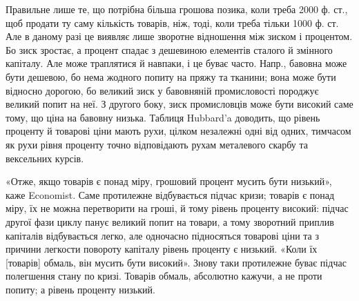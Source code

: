 Правильне лише те, що потрібна більша грошова позика, коли треба
2000 ф. ст., щоб продати ту саму кількість товарів, ніж, тоді, коли треба
тільки 1000 ф. ст. Але в даному разі це виявляє лише зворотне відношення
між зиском і процентом. Бо зиск зростає, а процент спадає з дешевиною елементів
сталого й змінного капіталу. Але може траплятися й навпаки, і це буває
часто. Напр., бавовна може бути дешевою, бо нема жодного попиту на
пряжу та тканини; вона може бути відносно дорогою, бо великий зиск у бавовняній
промисловості породжує великий попит на неї. З другого боку, зиск промисловців
може бути високий саме тому, що ціна на бавовну низька. Таблиця
Hubbard’a доводить, що рівень проценту й товарові ціни мають рухи, цілком незалежні
одні від одних, тимчасом як рухи рівня проценту точно відповідають
рухам металевого скарбу та вексельних курсів.

«Отже, якщо товарів є понад міру, грошовий процент мусить бути низький»,
каже Economist. Саме протилежне відбувається підчас кризи; товарів є понад міру, їх
не можна перетворити на гроші, й тому рівень проценту високий: підчас другої фази
циклу панує великий попит на товари, а тому зворотний приплив капіталів відбувається
легко, але одночасно підносяться товарові ціни та з причини легкости повороту
капіталу рівень проценту є низький. «Коли їх [товарів] обмаль, він мусить
бути високий». Знову таки протилежне буває підчас полегшення стану по кризі. Товарів
обмаль, абсолютно кажучи, а не проти попиту; а рівень проценту низький.
